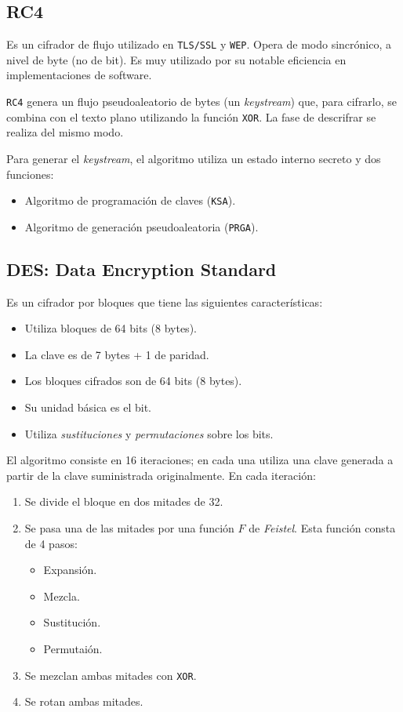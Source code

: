 \subsection{RC4}
Es un cifrador de flujo utilizado en \texttt{TLS/SSL} y \texttt{WEP}. Opera de modo sincrónico, a nivel de byte (no de bit). Es muy utilizado por su notable eficiencia en implementaciones de software.

\texttt{RC4} genera un flujo pseudoaleatorio de bytes (un \emph{keystream}) que, para cifrarlo, se combina con el texto plano utilizando la función \texttt{XOR}. La fase de descrifrar se realiza del mismo modo. 

Para generar el \emph{keystream}, el algoritmo utiliza un estado interno secreto y dos funciones:
\begin{itemize}
	\item Algoritmo de programación de claves (\texttt{KSA}).
	\item Algoritmo de generación pseudoaleatoria (\texttt{PRGA}).
\end{itemize}

\subsection{DES: Data Encryption Standard}
Es un cifrador por bloques que tiene las siguientes características:
\begin{itemize}
 	\item Utiliza bloques de 64 bits (8 bytes).
 	\item La clave es de 7 bytes + 1 de paridad.
 	\item Los bloques cifrados son de 64 bits (8 bytes).
 	\item Su unidad básica es el bit.
 	\item Utiliza \emph{sustituciones} y \emph{permutaciones} sobre los bits.
 \end{itemize}

 El algoritmo consiste en 16 iteraciones; en cada una utiliza una clave generada a partir de la clave suministrada originalmente. En cada iteración:
 \begin{enumerate}
 	\item Se divide el bloque en dos mitades de 32.
 	\item Se pasa una de las mitades por una función $F$ de \emph{Feistel}. Esta función consta de 4 pasos:
 	\begin{itemize}
 		\item Expansión.
 		\item Mezcla.
 		\item Sustitución.
 		\item Permutaión.
 	\end{itemize}
 	\item Se mezclan ambas mitades con \texttt{XOR}.
 	\item Se rotan ambas mitades.
 \end{enumerate}

